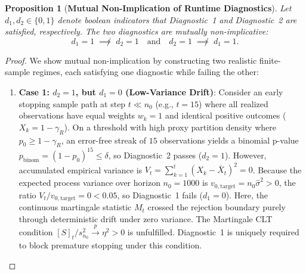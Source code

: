 \documentclass[11pt,a4paper]{article}
\newtheorem{proposition}[theorem]{Proposition}
\begin{document}
\begin{proposition}[\textbf{Mutual Non-Implication of Runtime Diagnostics}]\label{prop:mutual_independence}
Let $d_1, d_2 \in \{0, 1\}$ denote boolean indicators that Diagnostic~1 and Diagnostic~2 are satisfied, respectively. The two diagnostics are mutually non-implicative:
\begin{equation}
d_1 = 1 \;\not\implies\; d_2 = 1 \quad \text{and} \quad d_2 = 1 \;\not\implies\; d_1 = 1.
\end{equation}
\end{proposition}

\begin{proof}
We show mutual non-implication by constructing two realistic finite-sample regimes, each satisfying one diagnostic while failing the other:
\begin{enumerate}[leftmargin=*]
    \item \textbf{Case 1: $d_2 = 1$, but $d_1 = 0$ (Low-Variance Drift)}:
    Consider an early stopping sample path at step $t \ll n_0$ (e.g., $t = 15$) where all realized observations have equal weights $w_k = 1$ and identical positive outcomes ($X_k = 1 - \gamma_R$).
    On a threshold with high proxy partition density where $p_0 \ge 1 - \gamma_R$, an error-free streak of $15$ observations yields a binomial p-value $p_{\text{binom}} = (1 - p_0)^{15} \le \delta$, so Diagnostic~2 passes ($d_2 = 1$).
    However, accumulated empirical variance is $V_t = \sum_{k=1}^t (X_k - \bar{X}_t)^2 = 0$.
    Because the expected process variance over horizon $n_0 = 1000$ is $v_{0, \text{target}} = n_0 \hat{\sigma}^2 > 0$, the ratio $V_t / v_{0, \text{target}} = 0 < 0.05$, so Diagnostic~1 fails ($d_1 = 0$).
    Here, the continuous martingale statistic $M_t$ crossed the rejection boundary purely through deterministic drift under zero variance. The Martingale CLT condition $[S]_t / s_{n_0}^2 \xrightarrow{p} \eta^2 > 0$ is unfulfilled. Diagnostic~1 is uniquely required to block premature stopping under this condition.


\end{enumerate}
\end{proof}
\end{document}
